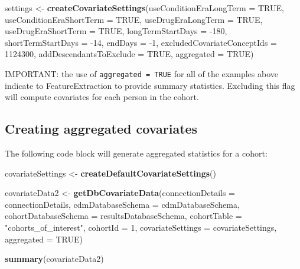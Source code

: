 \documentclass[11pt]{book}
\newenvironment{Shaded}{\begin{snugshade}}{\end{snugshade}}
\newcommand{\DataTypeTok}[1]{\textcolor[rgb]{0.13,0.29,0.53}{#1}}
\newcommand{\DecValTok}[1]{\textcolor[rgb]{0.00,0.00,0.81}{#1}}
\newcommand{\KeywordTok}[1]{\textcolor[rgb]{0.13,0.29,0.53}{\textbf{#1}}}
\newcommand{\NormalTok}[1]{#1}
\newcommand{\OtherTok}[1]{\textcolor[rgb]{0.56,0.35,0.01}{#1}}
\newcommand{\StringTok}[1]{\textcolor[rgb]{0.31,0.60,0.02}{#1}}
\theoremstyle{definition}
\theoremstyle{definition}
\theoremstyle{definition}
\theoremstyle{remark}
\let\BeginKnitrBlock\begin \let\EndKnitrBlock\end
\begin{document}
\begin{Shaded}
\begin{Highlighting}[]
\NormalTok{settings <-}\StringTok{ }\KeywordTok{createCovariateSettings}\NormalTok{(}\DataTypeTok{useConditionEraLongTerm =} \OtherTok{TRUE}\NormalTok{, }
                                    \DataTypeTok{useConditionEraShortTerm =} \OtherTok{TRUE}\NormalTok{, }
                                    \DataTypeTok{useDrugEraLongTerm =} \OtherTok{TRUE}\NormalTok{, }
                                    \DataTypeTok{useDrugEraShortTerm =} \OtherTok{TRUE}\NormalTok{, }
                                    \DataTypeTok{longTermStartDays =} \DecValTok{-180}\NormalTok{, }
                                    \DataTypeTok{shortTermStartDays =} \DecValTok{-14}\NormalTok{, }
                                    \DataTypeTok{endDays =} \DecValTok{-1}\NormalTok{, }
                                    \DataTypeTok{excludedCovariateConceptIds =} \DecValTok{1124300}\NormalTok{, }
                                    \DataTypeTok{addDescendantsToExclude =} \OtherTok{TRUE}\NormalTok{, }
                                    \DataTypeTok{aggregated =} \OtherTok{TRUE}\NormalTok{) }
\end{Highlighting}
\end{Shaded}

\BeginKnitrBlock{rmdimportant}
IMPORTANT: the use of \texttt{aggregated\ =\ TRUE} for all of the examples above indicate to FeatureExtraction to provide summary statistics. Excluding this flag will compute covariates for each person in the cohort.
\EndKnitrBlock{rmdimportant}

\hypertarget{creating-aggregated-covariates}{%
\subsection{Creating aggregated covariates}\label{creating-aggregated-covariates}}

The following code block will generate aggregated statistics for a cohort:

\begin{Shaded}
\begin{Highlighting}[]
\NormalTok{covariateSettings <-}\StringTok{ }\KeywordTok{createDefaultCovariateSettings}\NormalTok{() }

\NormalTok{covariateData2 <-}\StringTok{ }\KeywordTok{getDbCovariateData}\NormalTok{(}\DataTypeTok{connectionDetails =}\NormalTok{ connectionDetails, }
                                    \DataTypeTok{cdmDatabaseSchema =}\NormalTok{ cdmDatabaseSchema, }
                                    \DataTypeTok{cohortDatabaseSchema =}\NormalTok{ resultsDatabaseSchema, }
                                    \DataTypeTok{cohortTable =} \StringTok{"cohorts_of_interest"}\NormalTok{, }
                                    \DataTypeTok{cohortId =} \DecValTok{1}\NormalTok{, }
                                    \DataTypeTok{covariateSettings =}\NormalTok{ covariateSettings, }
                                    \DataTypeTok{aggregated =} \OtherTok{TRUE}\NormalTok{) }

\KeywordTok{summary}\NormalTok{(covariateData2) }
\end{Highlighting}
\end{Shaded}
\end{document}
